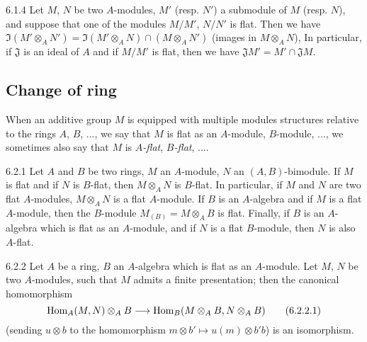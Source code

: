 \begin{env}{6.1.4}
\label{env-0.6.1.4}
Let $M$, $N$ be two $A$-modules, $M'$ (resp. $N'$) a submodule of $M$
(resp. $N$), and suppose that one of the modules $M/M'$, $N/N'$ is flat. Then we
have $\Im(M'\otimes_A N')=\Im(M'\otimes_A N)\cap(M\otimes_A N')$ (images in
$M\otimes_A N$), In particular, if $\mathfrak{J}$ is an ideal of $A$ and if
$M/M'$ is flat, then we have $\mathfrak{J}M'=M'\cap\mathfrak{J}M$.
\end{env}

\subsection{Change of ring}
\label{0-prelim-6.2}

When an additive group $M$ is equipped with multiple modules structures relative
to the rings $A$, $B$, ..., we say that $M$ is flat as an $A$-module,
$B$-module, ..., we sometimes also say that $M$ is \emph{$A$-flat},
\emph{$B$-flat}, ....

\begin{env}{6.2.1}
\label{env-0.6.2.1}
Let $A$ and $B$ be two rings, $M$ an $A$-module, $N$ an $(A,B)$-bimodule. If $M$
is flat and if $N$ is $B$-flat, then $M\otimes_A N$ is $B$-flat. In particular,
if $M$ and $N$ are two flat $A$-modules, $M\otimes_A N$ is a flat $A$-module. If
$B$ is an $A$-algebra and if $M$ is
a flat $A$-module, then the $B$-module $M_{(B)}=M\otimes_A B$ is flat. Finally,
if $B$ is an $A$-algebra which is flat as an $A$-module, and if $N$ is a flat
$B$-module, then $N$ is also $A$-flat.
\end{env}

\begin{env}{6.2.2}
\label{env-0.6.2.2}
Let $A$ be a ring, $B$ an $A$-algebra which is flat as an $A$-module. Let $M$,
$N$ be two $A$-modules, such that $M$ admits a finite presentation; then the
canonical homomorphism
\[
  {\mathop{\mathrm{Hom}}\nolimits}_A(M,N)\otimes_A B\longrightarrow{\mathop{\mathrm{Hom}}\nolimits}_B(M\otimes_A B,N\otimes_A B)
  \tag{6.2.2.1}
\]
(sending $u\otimes b$ to the homomorphism $m\otimes b'\mapsto u(m)\otimes b'b$)
is an isomorphism.
\end{env}

